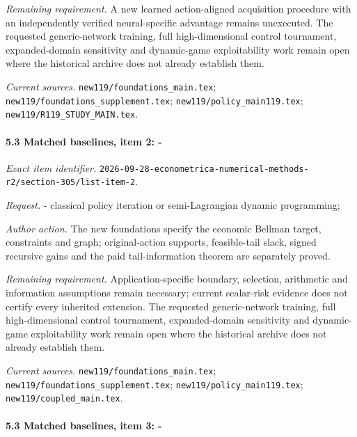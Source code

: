 \par\emph{Remaining requirement.} A new learned action-aligned acquisition procedure with an independently verified neural-specific advantage remains unexecuted. The requested generic-network training, full high-dimensional control tournament, expanded-domain sensitivity and dynamic-game exploitability work remain open where the historical archive does not already establish them.

\par\emph{Current sources.} \nolinkurl{new119/foundations_main.tex}; \nolinkurl{new119/foundations_supplement.tex}; \nolinkurl{new119/policy_main119.tex}; \nolinkurl{new119/R119_STUDY_MAIN.tex}.

\paragraph{5.3 Matched baselines, item 2: -}

\emph{Exact item identifier.} \nolinkurl{2026-09-28-econometrica-numerical-methods-r2/section-305/list-item-2}.

\par\emph{Request.} - classical policy iteration or semi-Lagrangian dynamic programming;

\par\emph{Author action.} The new foundations specify the economic Bellman target, constraints and graph; original-action supports, feasible-tail slack, signed recursive gains and the paid tail-information theorem are separately proved.

\par\emph{Remaining requirement.} Application-specific boundary, selection, arithmetic and information assumptions remain necessary; current scalar-risk evidence does not certify every inherited extension. The requested generic-network training, full high-dimensional control tournament, expanded-domain sensitivity and dynamic-game exploitability work remain open where the historical archive does not already establish them.

\par\emph{Current sources.} \nolinkurl{new119/foundations_main.tex}; \nolinkurl{new119/foundations_supplement.tex}; \nolinkurl{new119/policy_main119.tex}; \nolinkurl{new119/coupled_main.tex}.

\paragraph{5.3 Matched baselines, item 3: -}

